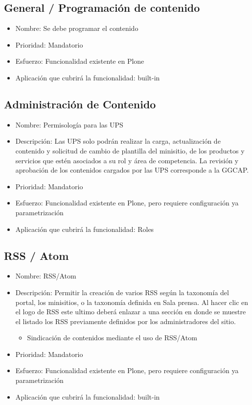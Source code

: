 \documentclass[11pt, letterpaper, oneside, spanish]{scrbook}
\begin{document}
\subsection{General / Programación de contenido}
\label{sec-2-1-6}

\begin{itemize}
\item Nombre: Se debe programar el contenido
\item Prioridad: Mandatorio
\item Esfuerzo: Funcionalidad existente en Plone
\item Aplicación que cubrirá la funcionalidad:  built-in
\end{itemize}
\subsection{Administración de Contenido}
\label{sec-2-1-7}

\begin{itemize}
\item Nombre: Permisología para las UPS
\item Descripción: Las UPS solo podrán realizar la carga, actualización de
  contenido y solicitud de cambio de plantilla del minisitio, de los productos
  y servicios que estén asociados a su rol y área de competencia. La revisión
  y aprobación de los contenidos cargados por las UPS corresponde a la GGCAP.
\item Prioridad: Mandatorio
\item Esfuerzo: Funcionalidad existente en Plone, pero requiere configuración ya
  parametrización
\item Aplicación que cubrirá la funcionalidad: Roles
\end{itemize}
\subsection{RSS / Atom}
\label{sec-2-1-8}

\begin{itemize}
\item Nombre: RSS/Atom
\item Descripción: Permitir la creación de varios RSS según la taxonomía del
  portal, los minisitios, o la taxonomía definida en Sala prensa. Al hacer
  clic en el logo de RSS este ultimo deberá enlazar a una sección en donde se
  muestre el listado los RSS previamente definidos por los administradores del
  sitio.
\begin{itemize}
\item Sindicación de contenidos mediante el uso de RSS/Atom
\end{itemize}
\item Prioridad: Mandatorio
\item Esfuerzo: Funcionalidad existente en Plone, pero requiere configuración ya
  parametrización
\item Aplicación que cubrirá la funcionalidad:  built-in
\end{itemize}
\end{document}
